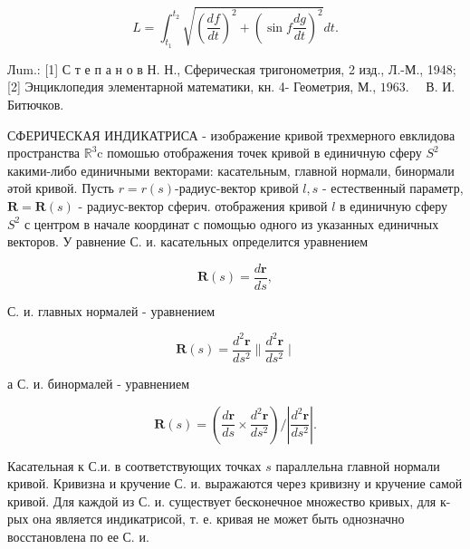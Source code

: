 \documentclass[10pt]{article}
\begin{document}
\[

L=\int_{t_{1}}^{t_{2}} \sqrt{\left(\frac{d f}{d t}\right)^{2}+\left(\sin f \frac{d g}{d t}\right)^{2}} d t .

\]



Лum.: [1] С т е п а н о в Н. Н., Сферическая тригонометрия, 2 изд., Л.-М., 1948; [2] Энциклопедия элементарной математики, кн. 4- Геометрия, М., $1963 . \quad$ В. И. Битючков.



СФЕРИЧЕСКАЯ ИНДИКАТРИСА - изображение кривой трехмерного евклидова пространства $\mathbb{R}^{3} \mathrm{c}$ помошью отображения точек кривой в единичную сферу $S^{2}$ какими-либо единичными векторами: касательным, главной нормали, бинормали әтой кривой. Пусть $r=r(s)$-радиус-вектор кривой $l, s$ - естественный параметр, $\boldsymbol{R}=\boldsymbol{R}(s)$ - радиус-вектор сферич. отображения кривой $l$ в единичную сферу $S^{2}$ с центром в начале координат с помощью одного из указанных единичных векторов. У равнение С. и. касательных определится уравнением



\[

\boldsymbol{R}(s)=\frac{d \boldsymbol{r}}{d s},

\]



С. и. главных нормалей - уравнением



\[

\boldsymbol{R}(s)=\frac{d^{2} \boldsymbol{r}}{d s^{2}} \| \frac{d^{2} \boldsymbol{r}}{d s^{2}} \mid

\]



а С. и. бинормалей - уравнением



\[

\boldsymbol{R}(s)=\left(\frac{d \boldsymbol{r}}{d s} \times \frac{d^{2} \boldsymbol{r}}{d s^{2}}\right) /\left|\frac{d^{2} \boldsymbol{r}}{d s^{2}}\right| .

\]



Касательная к С.и. в соответствующих точках $s$ параллельна главной нормали кривой. Кривизна и кручение С. и. выражаются через кривизну и кручение самой кривой. Для каждой из С. и. существует бесконечное множество кривых, для к-рых она является индикатрисой, т. е. кривая не может быть однозначно восстановлена по ее С. и.
\end{document}
